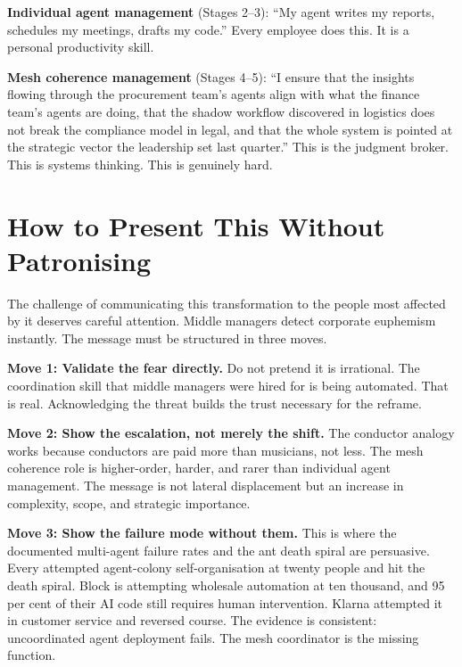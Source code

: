 \begin{definitionbox}[title={Two Levels of Agent Management}]
\textbf{Individual agent management} (Stages 2--3): ``My agent writes my reports, schedules my meetings, drafts my code.'' Every employee does this. It is a personal productivity skill.

\textbf{Mesh coherence management} (Stages 4--5): ``I ensure that the insights flowing through the procurement team's agents align with what the finance team's agents are doing, that the shadow workflow discovered in logistics does not break the compliance model in legal, and that the whole system is pointed at the strategic vector the leadership set last quarter.'' This is the judgment broker. This is systems thinking. This is genuinely hard.
\end{definitionbox}

\section{How to Present This Without Patronising}

The challenge of communicating this transformation to the people most affected by it deserves careful attention. Middle managers detect corporate euphemism instantly. The message must be structured in three moves.

\textbf{Move 1: Validate the fear directly.} Do not pretend it is irrational. The coordination skill that middle managers were hired for is being automated. That is real. Acknowledging the threat builds the trust necessary for the reframe.

\textbf{Move 2: Show the escalation, not merely the shift.} The conductor analogy works because conductors are paid more than musicians, not less. The mesh coherence role is higher-order, harder, and rarer than individual agent management. The message is not lateral displacement but an increase in complexity, scope, and strategic importance.

\textbf{Move 3: Show the failure mode without them.} This is where the documented multi-agent failure rates \parencite{Cemri2025} and the ant death spiral are persuasive. Every attempted agent-colony self-organisation at twenty people and hit the death spiral. Block is attempting wholesale automation at ten thousand, and 95 per cent of their AI code still requires human intervention. Klarna attempted it in customer service and reversed course. The evidence is consistent: uncoordinated agent deployment fails. The mesh coordinator is the missing function.

